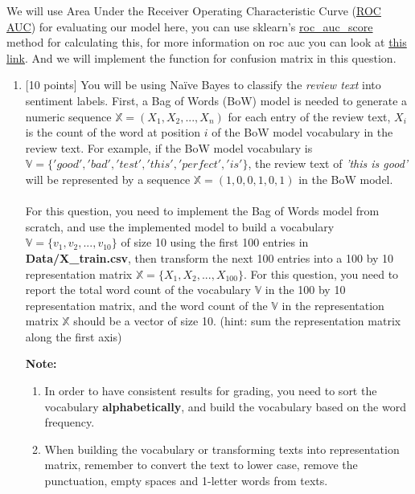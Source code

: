\documentclass[letterpaper]{article}
\begin{document}
We will use Area Under the Receiver Operating Characteristic Curve (\href{https://en.wikipedia.org/wiki/Receiver_operating_characteristic#Area_under_the_curve}{ROC AUC}) for evaluating our model here, you can use sklearn's \href{https://scikit-learn.org/stable/modules/generated/sklearn.metrics.roc_auc_score.html#sklearn.metrics.roc_auc_score}{roc\_auc\_score} method for calculating this, for more information on roc auc you can look at \href{https://towardsdatascience.com/understanding-auc-roc-curve-68b2303cc9c5#:~:text=ROC\%20is\%20a\%20probability\%20curve,capable\%20of\%20distinguishing\%20between\%20classes.&text=The\%20ROC\%20curve\%20is\%20plotted,is\%20on\%20the\%20x\%2Daxis.}{this link}. And we will implement the function for confusion matrix in this question.
\begin{enumerate}
\item {[10 points]} You will be using Na\"ive Bayes to classify the \textit{review text} into sentiment labels. First, a Bag of Words (BoW) model is needed to generate a numeric sequence $\mathbb{X} = (X_1, X_2, ..., X_n)$ for each entry of the review text, $X_i$ is the count of the word at position $i$ of the BoW model vocabulary in the review text. For example, if the BoW model vocabulary is $\mathbb{V} = \{'good', 'bad', 'test', 'this', 'perfect', 'is'\}$, the review text of \textit{'this is good'} will be represented by a sequence $\mathbb{X}=(1, 0, 0, 1, 0, 1)$ in the BoW model. \\
\\
For this question, you need to implement the Bag of Words model from scratch, and use the implemented model to build a vocabulary $\mathbb{V}=\{v_1, v_2, ..., v_{10}\}$ of size 10 using the first 100 entries in \textbf{Data/X\_train.csv}, then transform the next 100 entries into a 100 by 10 representation matrix $\mathbb{X} = \{X_1, X_2, ..., X_{100}\}$. For this question, you need to report the total word count of the vocabulary $\mathbb{V}$ in the 100 by 10 representation matrix, and the word count of the $\mathbb{V}$ in the representation matrix $\mathbb{X}$ should be a vector of size 10. (hint: sum the representation matrix along the first axis)

\textbf{Note:}
\begin{enumerate}
    \item In order to have consistent results for grading, you need to sort the vocabulary            \textbf{alphabetically}, and build the vocabulary based on the word frequency.
    \item When building the vocabulary or transforming texts into representation matrix, remember to convert the text to lower case, remove the punctuation, empty spaces and 1-letter words from texts.\\
\end{enumerate}
 


\end{enumerate}
\end{document}
